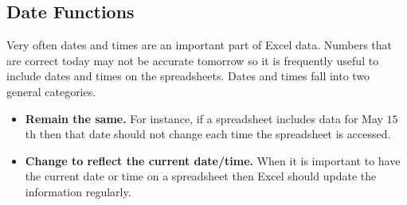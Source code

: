 %

\subsection{Date Functions}

Very often dates and times are an important part of Excel data. Numbers that are correct today may not be accurate tomorrow so it is frequently useful to include dates and times on the spreadsheets. Dates and times fall into two general categories.

\begin{itemize}
	\item \textbf{Remain the same.} For instance, if a spreadsheet includes data for May $ 15 $th then that date should not change each time the spreadsheet is accessed.
	\item \textbf{Change to reflect the current date/time.} When it is important to have the current date or time on a spreadsheet then Excel should update the information regularly.
\end{itemize}

